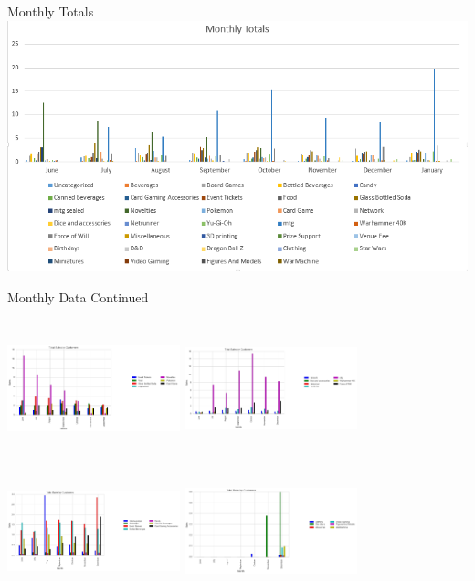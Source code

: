 \documentclass[compress,blue]{beamer}
\begin{document}
\begin{frame}{Monthly Totals}
\vspace{-.6cm}\hspace{9.5cm}\includegraphics[width=1\textwidth]{monthlyTotals}
\end{frame}

\begin{frame}{Monthly Data Continued}
\begin{rows}
\row{\textwidth}
\centering
\includegraphics[width=5cm,height=4cm]{SalesByMonth1}
\includegraphics[width=5cm,height=4cm]{SalesByMonth2}
\row{\textwidth}
\centering
\includegraphics[width=5cm,height=4cm]{SalesByMonth3}
\includegraphics[width=5cm,height=4cm]{SalesByMonth4}
\end{rows}
\end{frame}
\end{document}
